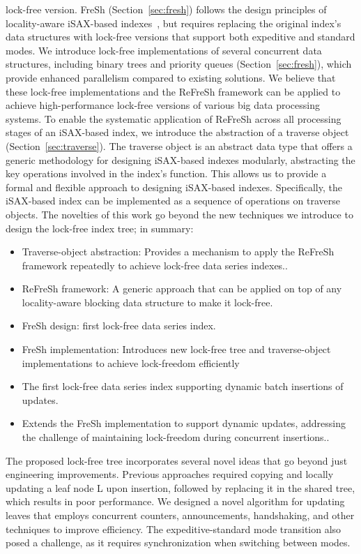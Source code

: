 \documentclass[a4paper,11pt,twoside,openany]{book}
\begin{document}
lock-free version. FreSh (Section~\ref{sec:fresh}) follows the design principles of locality-aware
iSAX-based indexes~\cite{isaxfamily,PFP21-I}, but requires replacing the original index’s data structures
with lock-free versions that support both expeditive and standard modes. We introduce lock-free
implementations of several concurrent data structures, including binary trees and priority queues
(Section~\ref{sec:fresh}), which provide enhanced parallelism compared to existing solutions.
%
We believe that these lock-free implementations and the ReFreSh framework can be applied to
achieve high-performance lock-free versions of various big data processing systems.
%
To enable the systematic application of ReFreSh across all processing stages of an iSAX-based index,
we introduce the abstraction of a traverse object (Section~\ref{sec:traverse}). The traverse object
is an abstract data type that offers a generic methodology for designing iSAX-based indexes modularly,
abstracting the key operations involved in the index’s function. This allows us to provide a
formal and flexible approach to designing iSAX-based indexes.
Specifically, the iSAX-based index can be implemented as a sequence of operations on traverse objects. 
%
The novelties of this work go beyond the new techniques we introduce to design the
lock-free index tree; in summary:
\begin{itemize}
\item Traverse-object abstraction: Provides a mechanism to apply the ReFreSh framework repeatedly to achieve lock-free data 
    series indexes..
\item ReFreSh framework: A generic approach that can be applied on top of any locality-aware blocking data structure to make it lock-free.
\item FreSh design: first lock-free data series index.
\item FreSh implementation: Introduces new lock-free tree and traverse-object implementations to achieve lock-freedom efficiently
\item The first lock-free data series index supporting dynamic batch insertions of updates.
\item Extends the FreSh implementation to support dynamic updates, addressing the challenge of maintaining lock-freedom during concurrent insertions..
\end{itemize}
The proposed lock-free tree incorporates several novel ideas that go beyond just engineering 
improvements. Previous approaches required copying and locally updating a leaf node L upon insertion,
followed by replacing it in the shared tree, which results in poor performance. We designed a novel
algorithm for updating leaves that employs concurrent counters, announcements, handshaking, and
other techniques to improve efficiency. The expeditive-standard mode transition also posed a
challenge, as it requires synchronization when switching between modes.
\end{document}
